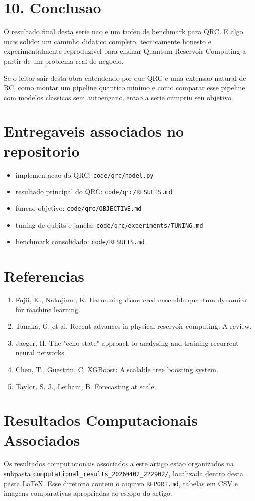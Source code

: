 \documentclass[12pt]{article}
\providecommand{\tightlist}{%
  \setlength{\itemsep}{0pt}\setlength{\parskip}{0pt}}
\begin{document}
\section{10. Conclusao}\label{10-conclusao}

O resultado final desta serie nao e um trofeu de benchmark para QRC. E algo mais solido: um caminho didatico completo, tecnicamente honesto e experimentalmente reproduzivel para ensinar Quantum Reservoir Computing a partir de um problema real de negocio.

Se o leitor sair desta obra entendendo por que QRC e uma extensao natural de RC, como montar um pipeline quantico minimo e como comparar esse pipeline com modelos classicos sem autoengano, entao a serie cumpriu seu objetivo.

\section{Entregaveis associados no repositorio}\label{entregaveis-associados-no-repositorio}

\begin{itemize}
\tightlist
\item
  implementacao do QRC: \texttt{code/qrc/model.py}
\item
  resultado principal do QRC: \texttt{code/qrc/RESULTS.md}
\item
  funcao objetivo: \texttt{code/qrc/OBJECTIVE.md}
\item
  tuning de qubits e janela: \texttt{code/qrc/experiments/TUNING.md}
\item
  benchmark consolidado: \texttt{code/RESULTS.md}
\end{itemize}

\section{Referencias}\label{referencias}

\begin{enumerate}
\def\labelenumi{\arabic{enumi}.}
\tightlist
\item
  Fujii, K., Nakajima, K. Harnessing disordered-ensemble quantum dynamics for machine learning.
\item
  Tanaka, G. et al. Recent advances in physical reservoir computing: A review.
\item
  Jaeger, H. The "echo state" approach to analysing and training recurrent neural networks.
\item
  Chen, T., Guestrin, C. XGBoost: A scalable tree boosting system.
\item
  Taylor, S. J., Letham, B. Forecasting at scale.
\end{enumerate}

\section*{Resultados Computacionais Associados}

Os resultados computacionais associados a este artigo estao organizados na subpasta \texttt{computational\_results\_20260402\_222902/}, localizada dentro desta pasta \LaTeX. Esse diretorio contem o arquivo \texttt{REPORT.md}, tabelas em CSV e imagens comparativas apropriadas ao escopo do artigo.
\end{document}
